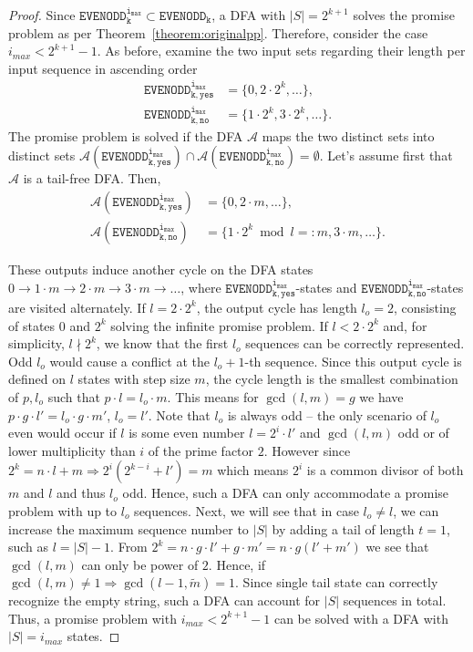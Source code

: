 \documentclass[../main.tex]{subfiles}
\begin{document}
\begin{proof}
    Since $\mathtt{EVENODD_k^{i_{max}}} \subset \mathtt{EVENODD_k}$, a DFA with $|S| = 2^{k + 1}$ solves the promise problem as per Theorem~\ref{theorem:originalpp}. Therefore, consider the case $i_{max} < 2^{k+1} - 1$. As before, examine the two input sets regarding their length per input sequence in ascending order
    \begin{align}
    \mathtt{EVENODD^{i_{max}}_{k,yes}} &= \{0, 2\cdot2^k, \dots \}, \\
        \mathtt{EVENODD^{i_{max}}_{k,no}} &= \{1\cdot2^k, 3\cdot2^k, \dots \}.
    \end{align}
    The promise problem is solved if the DFA $\mathcal{A}$ maps the two distinct sets into distinct sets $\mathcal{A}(\mathtt{EVENODD^{i_{max}}_{k,yes}}) \cap \mathcal{A}(\mathtt{EVENODD^{i_{max}}_{k,no} }) = \emptyset $.
    Let's assume first that $\mathcal{A}$ is a tail-free DFA. Then,
    \begin{align}
        \mathcal{A}(\mathtt{EVENODD^{i_{max}}_{k,yes}}) &= \{0, 2\cdot m, \dots \}, \\
        \mathcal{A}(\mathtt{EVENODD^{i_{max}}_{k,no}}) &= \{1\cdot2^k \bmod l  =: m, 3\cdot m, \dots \}.
    \end{align} 

    These outputs induce another cycle on the DFA states $0 \rightarrow 1\cdot m \rightarrow 2\cdot m \rightarrow 3 \cdot m \rightarrow \dots$, where $\mathtt{EVENODD^{i_{max}}_{k,yes}}$-states and $\mathtt{EVENODD^{i_{max}}_{k,no}}$-states are visited alternately. If $l = 2\cdot 2^k$, the output cycle has length $l_o = 2$, consisting of states $0$ and $2^k$ solving the infinite promise problem. If $l<2\cdot 2^k$ and, for simplicity, $l \nmid 2^k$, we know that the first $l_o$ sequences can be correctly represented. Odd $l_o$ would cause a conflict at the $l_o+1$-th sequence.  Since this output cycle is defined on $l$ states with step size $m$, the cycle length is the smallest combination of $p,l_o$ such that $p\cdot l = l_o\cdot m$. This means for $\gcd(l,m)=g$ we have $p \cdot g \cdot l' = l_o \cdot g \cdot m'$, $l_o = l'$. Note that $l_o$ is always odd -- the only scenario of $l_o$ even would occur if $l$ is some even number $l = 2^i\cdot l'$ and $\gcd(l,m)$ odd or of lower multiplicity than $i$ of the prime factor $2$. However since $2^k = n \cdot l + m \Rightarrow 2^i(2^{k-i} + l') = m$ which means $2^i$ is a common divisor of both $m$ and $l$ and thus $l_o$ odd. Hence, such a DFA can only accommodate a promise problem with up to $l_o$ sequences. 
    Next, we will see that in case $l_o \neq l$, we can increase the maximum sequence number to $|S|$ by adding a tail of length $t = 1$, such as $l = |S| - 1 $. From $2^k = n \cdot g \cdot l' + g \cdot m' = n\cdot g (l' + m')$ we see that $\gcd(l,m)$ can only be power of $2$. Hence, if  $\gcd(l,m) \neq 1 \Rightarrow \gcd(l-1, \tilde{m}) = 1$. Since single tail state can correctly recognize the empty string, such a DFA can account for $|S|$ sequences in total. Thus, a promise problem with $i_{max} < 2^{k+1} - 1$ can be solved with a DFA with $|S| = i_{max}$ states.
    \end{proof}
\end{document}
